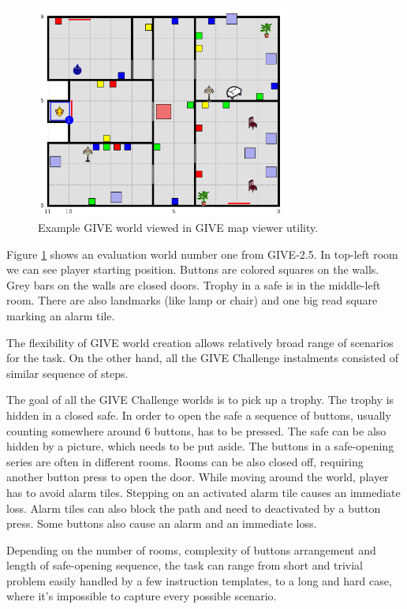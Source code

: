\begin{figure}[!htbp]
  \centering
	\includegraphics[width=0.75\textwidth]{Images/give-evalworldexmaple}
	\caption{Example GIVE world viewed in GIVE map viewer utility.}
	\label{fig:give-evalworldexmaple}
\end{figure}

Figure \ref{fig:give-evalworldexmaple} shows an evaluation world number one from GIVE-2.5. In top-left room we can see player starting position. Buttons are colored squares on the walls. Grey bars on the walls are closed doors. Trophy in a safe is in the middle-left room. There are also landmarks (like lamp or chair) and one big read square marking an alarm tile.

The flexibility of GIVE world creation allows relatively broad range of scenarios for the task. On the other hand, all the GIVE Challenge instalments consisted of similar sequence of steps.

The goal of all the GIVE Challenge worlds is to pick up a trophy. The trophy is hidden in a closed safe. In order to open the safe a sequence of buttons, usually counting somewhere around 6 buttons, has to be pressed. The safe can be also hidden by a picture, which needs to be put aside. The buttons in a safe-opening series are often in different rooms. Rooms can be also closed off, requiring another button press to open the door. While moving around the world, player has to avoid alarm tiles. Stepping on an activated alarm tile causes an immediate loss. Alarm tiles can also block the path and need to deactivated by a button press. Some buttons also cause an alarm and an immediate loss.

Depending on the number of rooms, complexity of buttons arrangement and length of safe-opening sequence, the task can range from short and trivial problem easily handled by a few instruction templates, to a long and hard case, where it's impossible to capture every possible scenario.

